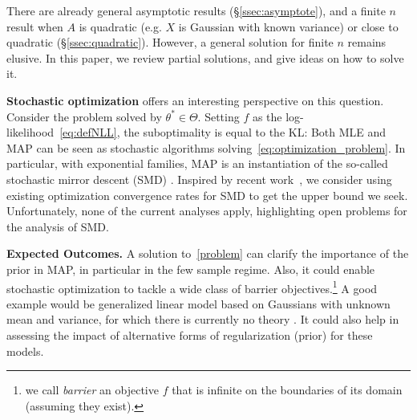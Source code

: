 \documentclass[twoside]{article}
\newcommand{\logpart}{A}
\newcommand{\nat}{\theta}
\begin{document}
There are already general asymptotic results (\S\ref{ssec:asymptote}), and a finite $n$ result when $\logpart$ is quadratic (e.g. $X$ is Gaussian with known variance)
or close to quadratic (\S\ref{ssec:quadratic}).
However, a  general solution for finite $n$ remains elusive.
In this paper, we review partial solutions, and give ideas on how to solve it.

{\bf Stochastic optimization} offers an interesting perspective on this question.
Consider the problem
solved by $\nat^*\in \Theta$.
Setting $f$ as the log-likelihood~\eqref{eq:defNLL}, the suboptimality is equal to the KL:
\alignn{
	f(\nat) - f(\nat^*) = \KL\paren{p_{\nat^*} || p_{\nat} } .
	\label{eq:suboptimalityKL}
}
Both MLE and MAP can be seen as stochastic algorithms solving~\eqref{eq:optimization_problem}.
In particular, with exponential families, MAP is an instantiation of the so-called stochastic mirror descent (SMD) \citep{nemirovski2009robust}.
Inspired by recent work~\citep{lepriol2021analysis, kunstner2020homeomorphic}, we consider using existing optimization convergence rates for SMD to get the upper bound we seek.
Unfortunately, none of the current analyses apply, highlighting open problems for the analysis of SMD.

{\bf Expected Outcomes.}
A solution to~\eqref{problem} can clarify the importance of the prior in MAP, in particular in the few sample regime. %
Also, it could enable stochastic optimization to tackle a wide class of barrier objectives.\footnote{we call \emph{barrier} an objective $f$ that is infinite on the boundaries of its domain (assuming they exist).}
A good example would be generalized linear model based on Gaussians with unknown mean and variance, for which there is currently no theory \citep{bach2013nonstronglyconvex}.
It could also help in assessing the impact of alternative forms of regularization (prior) for these models.
\end{document}

